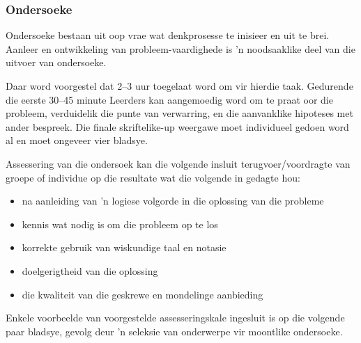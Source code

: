 \subsubsection{Ondersoeke}
Ondersoeke bestaan ​​uit oop vrae wat denkprosesse te inisieer en uit te brei. Aanleer en ontwikkeling van probleem-vaardighede is 'n noodsaaklike deel van die uitvoer van ondersoeke.\par

Daar word voorgestel dat 2--3 uur toegelaat word om vir hierdie taak. Gedurende die eerste 30--45 minute Leerders kan aangemoedig word om te praat oor die probleem, verduidelik die punte van verwarring, en die aanvanklike hipoteses met ander bespreek. Die finale skriftelike-up weergawe moet individueel gedoen word al en moet ongeveer vier bladsye.\par

Assessering van die ondersoek kan die volgende insluit terugvoer/voordragte van groepe of individue op die resultate wat die volgende in gedagte hou:
\begin{itemize}[noitemsep]
\item
  na aanleiding van 'n logiese volgorde in die oplossing van die probleme
\item
  kennis wat nodig is om die probleem op te los
\item
  korrekte gebruik van wiskundige taal en notasie
\item
  doelgerigtheid van die oplossing
\item
  die kwaliteit van die geskrewe en mondelinge aanbieding
\end{itemize}
Enkele voorbeelde van voorgestelde assesseringskale ingesluit is op die volgende paar bladsye, gevolg deur 'n seleksie van onderwerpe vir moontlike ondersoeke.


